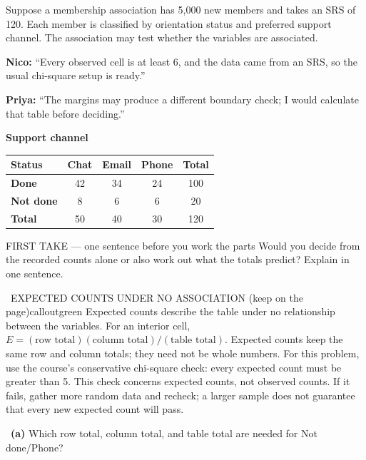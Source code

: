 \documentclass[11pt]{article}
\begin{document}
Suppose a membership association has 5,000 new members and takes an SRS of 120. Each member is classified by orientation status and preferred support channel. The association may test whether the variables are associated.\par\smallskip \textbf{Nico:} ``Every observed cell is at least 6, and the data came from an SRS, so the usual chi-square setup is ready.''\par \textbf{Priya:} ``The margins may produce a different boundary check; I would calculate that table before deciding.''\par
\begin{center}
\textbf{Support channel}\par\smallskip
\begin{tabular}{|l|c|c|c|c|}
\hline
\textbf{Status} & \textbf{Chat} & \textbf{Email} & \textbf{Phone} & \textbf{Total} \\ \hline
\textbf{Done} & 42 & 34 & 24 & 100 \\ \hline
\textbf{Not done} & 8 & 6 & 6 & 20 \\ \hline
\textbf{Total} & 50 & 40 & 30 & 120 \\ \hline
\end{tabular}
\end{center}
\begin{firsttakebox}{FIRST TAKE --- one sentence before you work the parts}
Would you decide from the recorded counts alone or also work out what the totals predict? Explain in one sentence.\par
{}
\end{firsttakebox}

\begin{callout}{\IconBook\ EXPECTED COUNTS UNDER NO ASSOCIATION (keep on the page)}{calloutgreen}
Expected counts describe the table under no relationship between the variables.
For an interior cell, $E=(\text{row total})(\text{column total})/(\text{table total})$.
Expected counts keep the same row and column totals; they need not be whole numbers.
For this problem, use the course's conservative chi-square check: every expected count must be
greater than 5. This check concerns expected counts, not observed counts. If it fails, gather more
random data and recheck; a larger sample does not guarantee that every new expected count will pass.
\end{callout}

~\textbf{(a)} Which row total, column total, and table total are needed for Not done/Phone?\par
{}
\end{document}
